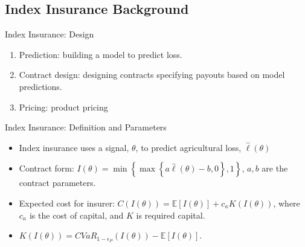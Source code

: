 \documentclass{beamer}
\begin{document}
  
\subsection{Index Insurance Background}

\begin{frame}{Index Insurance: Design}
\begin{enumerate}
    \setlength\itemsep{2em}
    \item Prediction: building a model to predict loss. 
    \item Contract design: designing contracts specifying payouts based on model predictions.
    \item Pricing: product pricing
\end{enumerate}
\end{frame} 

\begin{frame}{Index Insurance: Definition and Parameters}
\begin{itemize}
    \setlength\itemsep{1em}
    \item Index insurance uses a signal, $\theta$, to predict agricultural loss, $\hat{\ell}(\theta)$
    \item Contract form: $I(\theta) = \min \left \{ \max \left \{a\hat{\ell}(\theta) - b,0 \right \}, 1 \right \}$, $a,b$ are the contract parameters.
    \item Expected cost for insurer: $C(I(\theta)) = \mathbb{E}[I(\theta)] + c_{\kappa} K(I(\theta))$, where $c_{\kappa}$ is the cost of capital, and $K$ is required capital.
    \item $K(I(\theta)) = CVaR_{1-\epsilon_P}\left ( I(\theta) \right ) - \mathbb{E}[I(\theta)]$.
\end{itemize}
\end{frame}
\end{document}

